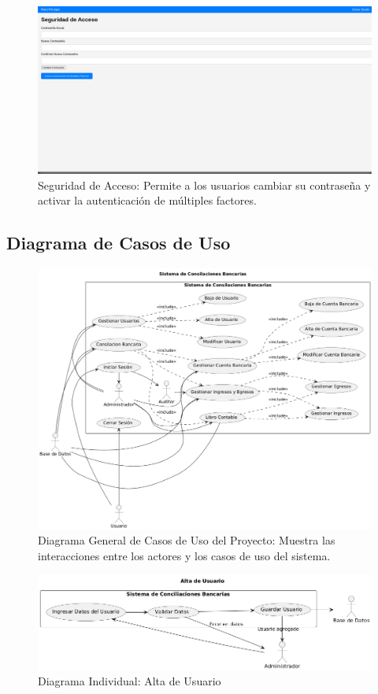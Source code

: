 \documentclass{article}
\begin{document}
\begin{figure}[H]
    \centering
    \includegraphics[width=\textwidth]{img/image9.png}
    \caption{Seguridad de Acceso: Permite a los usuarios cambiar su contraseña y activar la autenticación de múltiples factores.}
\end{figure}

\subsection{Diagrama de Casos de Uso}

\begin{figure}[H]
    \centering
    \includegraphics[width=\textwidth]{casos/UML-General.png}
    \caption{Diagrama General de Casos de Uso del Proyecto: Muestra las interacciones entre los actores y los casos de uso del sistema.}
\end{figure}

\begin{figure}[H]
    \centering
    \includegraphics[width=\textwidth]{casos/AltaUsuario.png}
    \caption{Diagrama Individual: Alta de Usuario}
\end{figure}
\end{document}
